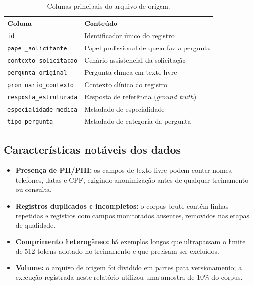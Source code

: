 \documentclass[12pt,a4paper]{article}
\begin{document}
\begin{table}[htbp]
\centering
\caption{Colunas principais do arquivo de origem.}
\label{tab:colunas}
\footnotesize
\begin{tabularx}{\textwidth}{L{5.0cm} X}
\toprule
\textbf{Coluna} & \textbf{Conteúdo} \\
\midrule
\texttt{id} & Identificador único do registro \\
\texttt{papel\_solicitante} & Papel profissional de quem faz a pergunta \\
\texttt{contexto\_solicitacao} & Cenário assistencial da solicitação \\
\texttt{pergunta\_original} & Pergunta clínica em texto livre \\
\texttt{prontuario\_contexto} & Contexto clínico do registro \\
\texttt{resposta\_estruturada} & Resposta de referência (\emph{ground truth}) \\
\texttt{especialidade\_medica} & Metadado de especialidade \\
\texttt{tipo\_pergunta} & Metadado de categoria da pergunta \\
\bottomrule
\end{tabularx}
\end{table}

\subsection{Características notáveis dos dados}

\begin{itemize}[leftmargin=*]
  \item \textbf{Presença de PII/PHI:} os campos de texto livre podem conter
        nomes, telefones, datas e CPF, exigindo anonimização antes de qualquer
        treinamento ou consulta.
  \item \textbf{Registros duplicados e incompletos:} o corpus bruto contém linhas
        repetidas e registros com campos monitorados ausentes, removidos nas
        etapas de qualidade.
  \item \textbf{Comprimento heterogêneo:} há exemplos longos que ultrapassam o
        limite de 512 tokens adotado no treinamento e que precisam ser excluídos.
  \item \textbf{Volume:} o arquivo de origem foi dividido em partes para
        versionamento; a execução registrada neste relatório utilizou uma
        amostra de 10\% do corpus.
\end{itemize}
\end{document}
